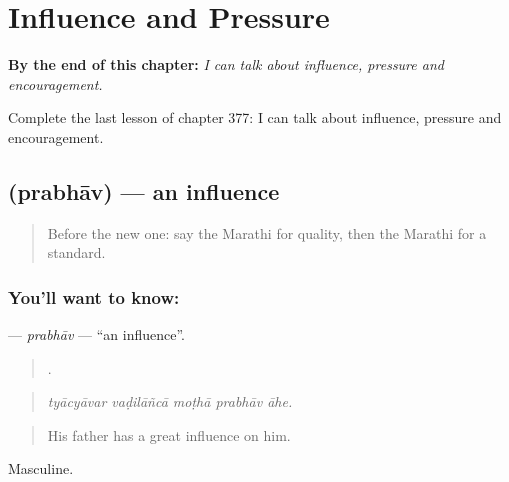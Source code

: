 
\chapter{Influence and Pressure}
\label{ch:mr-influence-and-pressure}

\begin{chapteropening}
\textbf{By the end of this chapter:} \emph{I can talk about influence, pressure and encouragement.}

Complete the last lesson of chapter 377: I can talk about influence, pressure and encouragement.
\end{chapteropening}

\section[\texorpdfstring{\mr{प्रभाव} (prabhāv)}{प्रभाव (prabhāv)}]{ (prabhāv) — an influence}

\label{lesson:MR-C377-prabhav}



\begin{quote}
Before the new one: say the Marathi for quality, then the Marathi for a standard.
\end{quote}

\subsection*{You'll want to know: }
\textbf{} — \emph{prabhāv} — \textquotedblleft{}an influence\textquotedblright{}.

\begin{quote}
    .
\end{quote}

\begin{quote}
\emph{tyācyāvar vaḍilāñcā moṭhā prabhāv āhe.}
\end{quote}

\begin{quote}
His father has a great influence on him.
\end{quote}

Masculine.

